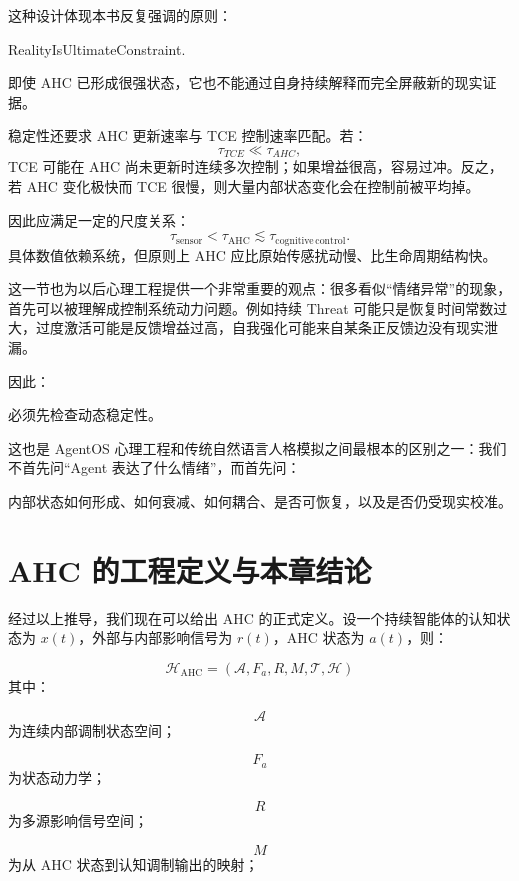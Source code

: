 这种设计体现本书反复强调的原则：
\begin{statementbox}
RealityIsUltimateConstraint.
\end{statementbox}

即使 AHC 已形成很强状态，它也不能通过自身持续解释而完全屏蔽新的现实证据。

稳定性还要求 AHC 更新速率与 TCE 控制速率匹配。若：
\[
\tau_{TCE}
\ll
\tau_{AHC},
\]
TCE 可能在 AHC 尚未更新时连续多次控制；如果增益很高，容易过冲。反之，若 AHC 变化极快而 TCE 很慢，则大量内部状态变化会在控制前被平均掉。

因此应满足一定的尺度关系：
\[
\tau_{\mathrm{sensor}}
<
\tau_{\mathrm{AHC}}
\lesssim
\tau_{\mathrm{cognitive\,control}}.
\]
具体数值依赖系统，但原则上 AHC 应比原始传感扰动慢、比生命周期结构快。

这一节也为以后心理工程提供一个非常重要的观点：很多看似“情绪异常”的现象，首先可以被理解成控制系统动力问题。例如持续 Threat 可能只是恢复时间常数过大，过度激活可能是反馈增益过高，自我强化可能来自某条正反馈边没有现实泄漏。

因此：
\begin{statementbox}
\centering
{}
\end{statementbox}
必须先检查动态稳定性。

这也是 AgentOS 心理工程和传统自然语言人格模拟之间最根本的区别之一：我们不首先问“Agent 表达了什么情绪”，而首先问：
\begin{statementbox}
内部状态如何形成、如何衰减、如何耦合、是否可恢复，以及是否仍受现实校准。
\end{statementbox}

\section{AHC 的工程定义与本章结论}

经过以上推导，我们现在可以给出 AHC 的正式定义。设一个持续智能体的认知状态为 \(x(t)\)，外部与内部影响信号为 \(r(t)\)，AHC 状态为 \(a(t)\)，则：

\[
\boxed{
\mathcal H_{\mathrm{AHC}}
=
(
\mathcal A,
F_a,
R,
M,
\mathcal T,
\mathcal H
)
}
\]
其中：

\[
\mathcal A
\]
为连续内部调制状态空间；

\[
F_a
\]
为状态动力学；

\[
R
\]
为多源影响信号空间；

\[
M
\]
为从 AHC 状态到认知调制输出的映射；

